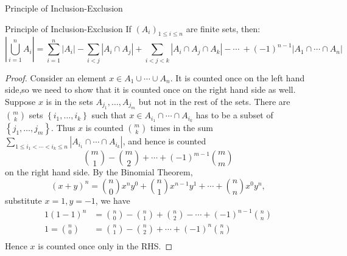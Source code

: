 \begin{mysubsection}{Principle of Inclusion-Exclusion}
    \begin{theorem}[thm:]{Principle of Inclusion-Exclusion}
        If $(A_i)_{1\leq i\leq n}$ are finite sets, then:
        \[\left|\bigcup_{i=1}^n A_i\right|=\sum_{i=1}^n\left|A_i\right| -\sum_{i < j}\left|A_i\cap A_j\right| +\sum_{i<j<k}\left|A_i\cap A_j\cap A_k\right|-\cdots\ +(-1)^{n-1} \left|A_1\cap\cdots\cap A_n\right|{}\]
    \end{theorem}

    \begin{proof}
        Consider an element $x\in A_1\cup \cdots \cup A_n$. It is counted once on the left hand side,so we need to show that it is counted once on the right hand side as well.  Suppose $x$ is in the sets $A_{j_{1}},\dots ,A_{j_{m}}$ but not in the rest of the sets. There are ${m\choose k}$ sets $\left\{i_1,\dots ,i_k\right\}$ such that $x\in A_{i_{1}}\cap \cdots \cap A_{i_{k}}$ has to be a subset of $\left\{j_1,\dots ,j_m\right\}$. Thus $x$ is counted ${m\choose k}$ times in the sum $\sum_{1\leq i_1<\cdots <i_k\leq n}^{}\left|A_{i_{1}}\cap \cdots \cap A_{i_{k}}\right|$, and hence is counted
        \[{m\choose 1}-{m\choose 2}+\cdots +(-1)^{m-1}{m\choose m}\]
        on the right hand side. By the Binomial Theorem,
        \[(x+y)^n={n\choose 0}x^ny^0+{n\choose 1}x^{n-1}y^1+\cdots +{n\choose n}x^0y^n,\]
        substitute $x=1,y=-1$, we have
        \begin{alignat*}{1}
            (1-1)^n&= {n\choose 0}-{n\choose 1}+{n\choose 2}-\cdots +(-1)^{n-1}{n\choose n}\\
            1={n\choose 0}&= {n\choose 1}-{n\choose 2}+\cdots +(-1)^{n}{n\choose n}\\
        \end{alignat*}
        Hence $x$ is counted once only in the RHS.
    \end{proof}


\mynewpage
\end{mysubsection}

